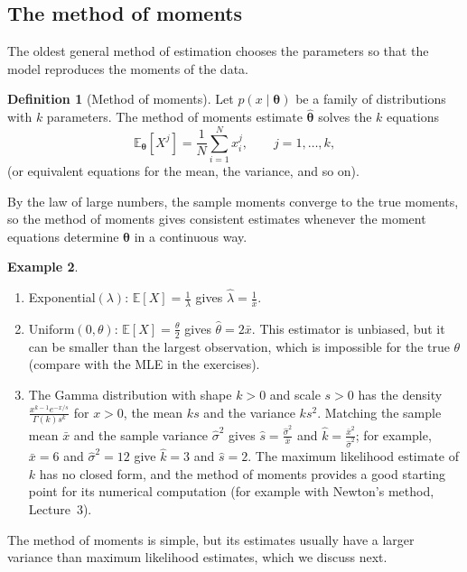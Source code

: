 \documentclass[11pt]{article}
\newcommand{\E}{\mathbb{E}}
\theoremstyle{definition}
\newtheorem{definition}{Definition}[section]
\newtheorem{example}[definition]{Example}
\theoremstyle{plain}
\theoremstyle{remark}
\begin{document}
\subsection{The method of moments}

The oldest general method of estimation chooses the parameters so that the model reproduces the moments of the data.

\begin{definition}[Method of moments]\label{def:moments}
    Let $p(x \mid \boldsymbol{\theta})$ be a family of distributions with $k$ parameters. The method of moments estimate $\hat{\boldsymbol{\theta}}$ solves the $k$ equations
    \[\E_{\boldsymbol{\theta}}[X^j] = \frac{1}{N}\sum_{i=1}^N x_i^j, \qquad j = 1, \ldots, k,\]
    (or equivalent equations for the mean, the variance, and so on).
\end{definition}

By the law of large numbers, the sample moments converge to the true moments, so the method of moments gives consistent estimates whenever the moment equations determine $\boldsymbol{\theta}$ in a continuous way.

\begin{example}\label{ex:moments}
    \begin{enumerate}
        \item Exponential$(\lambda)$: $\E[X] = \frac{1}{\lambda}$ gives $\hat\lambda = \frac{1}{\bar x}$.
        \item Uniform$(0, \theta)$: $\E[X] = \frac{\theta}{2}$ gives $\hat\theta = 2\bar x$. This estimator is unbiased, but it can be smaller than the largest observation, which is impossible for the true $\theta$ (compare with the MLE in the exercises).
        \item The Gamma distribution with shape $k > 0$ and scale $s > 0$ has the density $\frac{x^{k-1}e^{-x/s}}{\Gamma(k)s^k}$ for $x > 0$, the mean $ks$ and the variance $ks^2$. Matching the sample mean $\bar x$ and the sample variance $\hat\sigma^2$ gives $\hat s = \frac{\hat\sigma^2}{\bar x}$ and $\hat k = \frac{\bar x^2}{\hat\sigma^2}$; for example, $\bar x = 6$ and $\hat\sigma^2 = 12$ give $\hat k = 3$ and $\hat s = 2$. The maximum likelihood estimate of $k$ has no closed form, and the method of moments provides a good starting point for its numerical computation (for example with Newton's method, Lecture~3).
    \end{enumerate}
\end{example}

The method of moments is simple, but its estimates usually have a larger variance than maximum likelihood estimates, which we discuss next.
\end{document}
